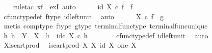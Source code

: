 \begin{isabellebody}
\ \ \isamarkupfalse%
\ {\isacharparenleft}{\kern0pt}rule{\isacharunderscore}{\kern0pt}tac\ x{\isacharequal}{\kern0pt}f\ \ exI{\isacharcomma}{\kern0pt}\ auto{\isacharparenright}{\kern0pt}\isanewline
\ \ \ \ \isamarkupfalse%
\ {\isachardoublequoteopen}id\ X\ {\isasymcirc}\isactrlsub c\ f\ {\isacharequal}{\kern0pt}\ f{\isachardoublequoteclose}\isanewline
\ \ \ \ \ \ \isamarkupfalse%
\ cfunc{\isacharunderscore}{\kern0pt}type{\isacharunderscore}{\kern0pt}def\ f{\isacharunderscore}{\kern0pt}type\ id{\isacharunderscore}{\kern0pt}left{\isacharunderscore}{\kern0pt}unit\ \isamarkupfalse%
\ auto\isanewline
\ \ \ \ \isamarkupfalse%
\ {\isachardoublequoteopen}{\isasymbeta}\isactrlbsub X\isactrlesub \ {\isasymcirc}\isactrlsub c\ f\ {\isacharequal}{\kern0pt}\ g{\isachardoublequoteclose}\isanewline
\ \ \ \ \ \ \isamarkupfalse%
\ {\isacharparenleft}{\kern0pt}metis\ comp{\isacharunderscore}{\kern0pt}type\ f{\isacharunderscore}{\kern0pt}type\ g{\isacharunderscore}{\kern0pt}type\ terminal{\isacharunderscore}{\kern0pt}func{\isacharunderscore}{\kern0pt}type\ terminal{\isacharunderscore}{\kern0pt}func{\isacharunderscore}{\kern0pt}unique{\isacharparenright}{\kern0pt}\isanewline
\ \ \ \ \isamarkupfalse%
\ {\isachardoublequoteopen}{\isasymAnd}h{}{\isachardot}{\kern0pt}\ h{}\ {\isacharcolon}{\kern0pt}\ Y\ {\isasymrightarrow}\ X\ {\isasymLongrightarrow}\ h{}\ {\isacharequal}{\kern0pt}\ id\isactrlsub c\ X\ {\isasymcirc}\isactrlsub c\ h{}{\isachardoublequoteclose}\isanewline
\ \ \ \ \ \ \isamarkupfalse%
\ cfunc{\isacharunderscore}{\kern0pt}type{\isacharunderscore}{\kern0pt}def\ id{\isacharunderscore}{\kern0pt}left{\isacharunderscore}{\kern0pt}unit\ \isamarkupfalse%
\ auto\isanewline
\ \ \isamarkupfalse%
\isanewline
{}\isamarkupfalse%
%
\endisatagproof
{\isafoldproof}%
%
\isadelimproof
\isanewline
%
\endisadelimproof
\isanewline
{}\isamarkupfalse%
\ X{\isacharunderscore}{\kern0pt}is{\isacharunderscore}{\kern0pt}cart{\isacharunderscore}{\kern0pt}prod{}{\isacharcolon}{\kern0pt}\isanewline
\ \ {\isachardoublequoteopen}is{\isacharunderscore}{\kern0pt}cart{\isacharunderscore}{\kern0pt}prod\ X\ {\isacharparenleft}{\kern0pt}{\isasymbeta}\isactrlbsub X\isactrlesub {\isacharparenright}{\kern0pt}\ {\isacharparenleft}{\kern0pt}id\ X{\isacharparenright}{\kern0pt}\ one\ X{\isachardoublequoteclose}\isanewline
%
\isadelimproof
\ \ %

\end{isabellebody}
